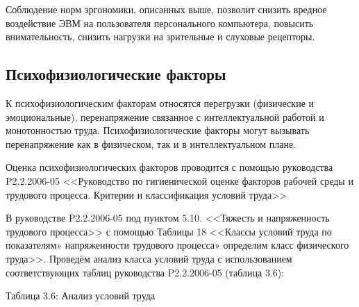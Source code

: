 Соблюдение норм эргономики, описанных выше, позволит снизить вред\-ное воздействие ЭВМ на пользователя персонального компьютера, повысить вни\-мательность, снизить наг\-рузки на зрительные и слуховые рецепторы.

\subsection{Психофизиологические факторы}

К психофизиологическим факторам относятся перегрузки (физические и эмоциональ\-ные), перенапряжение связанное с интеллектуальной работой и монотонностью труда. Психофи\-зиологические факторы могут вызывать перенапряжение как в физическом, так и в интел\-лектуальном плане.

Оценка психофизиологических факторов проводится с помощью руковод\-ства P2.2.2006-05 <<Руководство по гигиенической оценке факторов рабочей среды и трудового процесса. Критерии и классификация условий труда>>

В руководстве P2.2.2006-05 под пунктом 5.10. <<Тяжесть и напряженность трудового процесса>> с помощью Таблицы 18 <<Классы условий труда по по\-казателям» напряженности трудового процесса» определим класс физичес\-кого труда>>.
\newpage
Проведём анализ класса условий труда с использованием соответству\-ющих таблиц руководства P2.2.2006-05 (таблица  $3.6$):


\begin{center}
Таблица 3.6: Анализ условий труда
\end{center}

